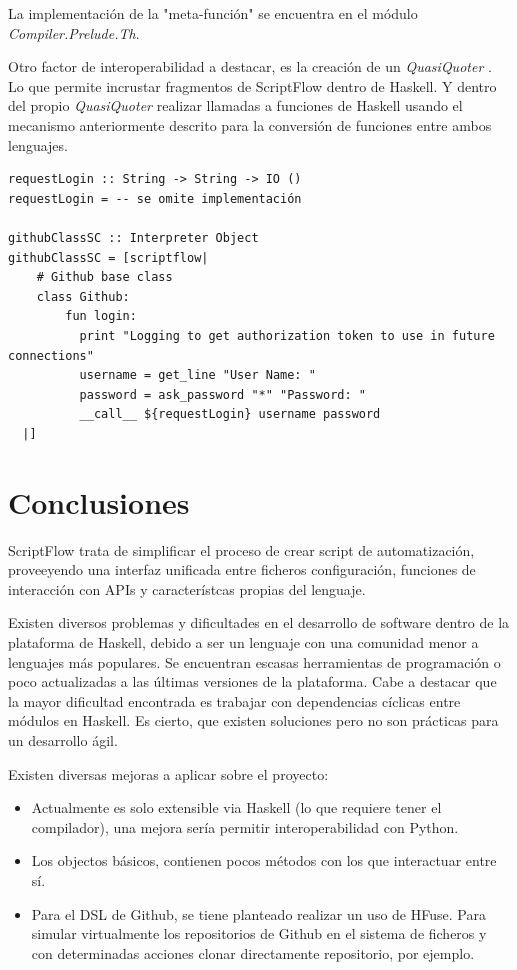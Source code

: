 \documentclass[11pt]{article}
\begin{document}
La implementación de la "meta-función" se encuentra en el módulo \emph{Compiler.Prelude.Th}.

Otro factor de interoperabilidad a destacar, es la creación de un \emph{QuasiQuoter} \cite{quasi-quoter}. Lo que permite incrustar fragmentos de ScriptFlow
dentro de Haskell. Y dentro del propio \emph{QuasiQuoter} realizar llamadas a funciones de Haskell usando el mecanismo anteriormente descrito
para la conversión de funciones entre ambos lenguajes.

\begin{verbatim}
requestLogin :: String -> String -> IO ()
requestLogin = -- se omite implementación

githubClassSC :: Interpreter Object
githubClassSC = [scriptflow|
    # Github base class
    class Github:
        fun login:
          print "Logging to get authorization token to use in future connections"
          username = get_line "User Name: "
          password = ask_password "*" "Password: "
          __call__ ${requestLogin} username password
  |]
\end{verbatim}

\section{Conclusiones}
\label{sec:orgde9ac4f}

ScriptFlow trata de simplificar el proceso de crear script de automatización, proveeyendo una interfaz unificada entre ficheros
configuración, funciones de interacción con APIs y característcas propias del lenguaje.

Existen diversos problemas y dificultades en el desarrollo de software dentro de la plataforma de Haskell, debido a ser un lenguaje
con una comunidad menor a lenguajes más populares. Se encuentran escasas herramientas de programación o poco actualizadas a las últimas versiones de la plataforma.
Cabe a destacar que la mayor dificultad encontrada es trabajar con dependencias cíclicas entre módulos en Haskell. Es cierto, que existen soluciones pero
no son prácticas para un desarrollo ágil.

Existen diversas mejoras a aplicar sobre el proyecto:
\begin{itemize}
\item Actualmente es solo extensible via Haskell (lo que requiere tener el compilador), una mejora sería permitir interoperabilidad con Python.
\item Los objectos básicos, contienen pocos métodos con los que interactuar entre sí.
\item Para el DSL de Github, se tiene planteado realizar un uso de HFuse. Para simular virtualmente los repositorios de Github en el sistema de ficheros
y con determinadas acciones clonar directamente repositorio, por ejemplo.
\end{itemize}
\end{document}
